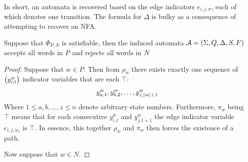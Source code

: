 In short, an automata is recovered based on the edge indicators
\(e_{i, j, \sigma}\),
each of which denotes one transition.
The formula for \(\Delta\) is bulky as a consequence of attempting to
recover an NFA.

\begin{theorem}
  Suppose that \(\Phi_{P, N}\) is satisfiable,
  then the induced automata \(\mathcal{A} = \left(\Sigma, Q, \Delta, S, F\right)\)
  accepts all words in \(P\) and rejects all words in \(N\)
\end{theorem}
\begin{proof}
  Suppose that \(w \in P\).
  Then from \(\rho_w\)
  there exists exactly one sequence of \(\left(y_{i, t}^w\right)\)
  indicator variables that are each \(\top\):
  \begin{align*}
    y_{a, 1}^w, y_{b, 2}^w, \ldots, y_{z, \left\lvert w\right\rvert + 1}^w
  \end{align*}
  Where \(1 \leq a, b, \ldots, z \leq n\) denote arbitrary state numbers.
  Furthermore, \(\pi_w\) being \(\top\) means that for each consecutive
  \(y_{i, t}^w\) and \(y_{j, t + 1}^w\) the edge indicator variable
  \(e_{i, j, w_{t}}\) is \(\top\).
  In essence, this together \(\rho_w\) and \(\pi_w\) then forces
  the existence of a path.



  Now suppose that \(w \in N\).

\end{proof}



